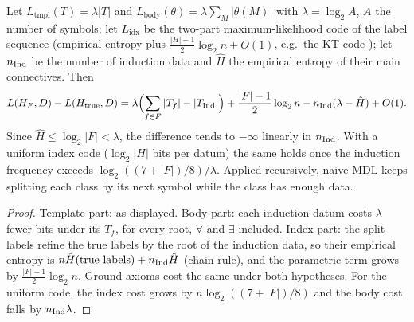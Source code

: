 \begin{proposition}\label{prop:many:mdlnaive}
Let $L_{\mathrm{tmpl}}(T)=\lambda|T|$ and $L_{\mathrm{body}}(\theta)=\lambda\sum_M|\theta(M)|$ with $\lambda=\log_2A$, $A$ the number
of symbols; let $L_{\mathrm{idx}}$ be the two-part maximum-likelihood code of the label sequence (empirical entropy plus
$\frac{|H|-1}2\log_2n+O(1)$, e.g.\ the KT code \citep{krichevsky1981performance}); let $n_{\mathrm{Ind}}$ be the number of induction
data and $\hat H$ the empirical entropy of their main connectives. Then
\[
L(H_F,D)-L(H_{\mathrm{true}},D)=\lambda\Bigl(\sum_{f\in F}|T_f|-|T_{\mathrm{Ind}}|\Bigr)+\frac{|F|-1}2\log_2n-n_{\mathrm{Ind}}(\lambda-\hat H)+O(1).
\]
Since $\hat H\le\log_2|F|<\lambda$, the difference tends to $-\infty$ linearly in $n_{\mathrm{Ind}}$. With a uniform index code
($\log_2|H|$ bits per datum) the same holds once the induction frequency exceeds $\log_2((7+|F|)/8)/\lambda$. Applied
recursively, naive MDL keeps splitting each class by its next symbol while the class has enough data.
\end{proposition}
\begin{proof}
Template part: as displayed. Body part: each induction datum costs $\lambda$ fewer bits under its $T_f$, for every root,
$\forall$ and $\exists$ included. Index part: the split labels refine the true labels by the root of the induction data, so
their empirical entropy is $n\hat H(\text{true labels})+n_{\mathrm{Ind}}\hat H$ (chain rule), and the parametric term grows by
$\frac{|F|-1}2\log_2n$. Ground axioms cost the same under both hypotheses. For the uniform code, the index cost grows by
$n\log_2((7+|F|)/8)$ and the body cost falls by $n_{\mathrm{Ind}}\lambda$.
\end{proof}

